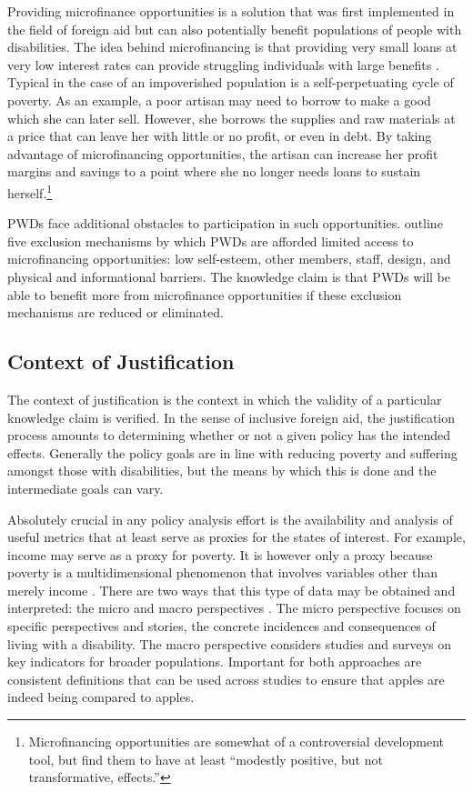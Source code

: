 \documentclass[a4paper]{article}
\begin{document}
Providing microfinance opportunities is a solution that was first implemented
in the field of foreign aid but can also potentially benefit populations of
people with disabilities. The idea behind microfinancing is that providing
very small loans at very low interest rates can provide struggling individuals
with large benefits \citep{wendt2006building}. Typical in the case of an
impoverished population is a self-perpetuating cycle of poverty. As an
example, a poor artisan may need to borrow to make a good which she can later
sell. However, she borrows the supplies and raw materials at a price that can
leave her with little or no profit, or even in debt. By taking advantage of
microfinancing opportunities, the artisan can increase her profit margins and
savings to a point where she no longer needs loans to sustain
herself.\footnote{Microfinancing opportunities are somewhat of a controversial
    development tool, but \cite{banerjee2015six} find them to have at least
``modestly positive, but not transformative, effects.''}

PWDs face additional obstacles to participation in such opportunities.
\cite{mersland2008access} outline five exclusion mechanisms by which PWDs are
afforded limited access to microfinancing opportunities: low self-esteem,
other members, staff, design, and physical and informational barriers. The
knowledge claim is that PWDs will be able to benefit more from microfinance
opportunities if these exclusion mechanisms are reduced or eliminated.

\subsection{Context of Justification}

The context of justification is the context in which the validity of a
particular knowledge claim is verified. In the sense of inclusive foreign aid,
the justification process amounts to determining whether or not a given policy
has the intended effects. Generally the policy goals are in line with reducing
poverty and suffering amongst those with disabilities, but the means by which
this is done and the intermediate goals can vary.

Absolutely crucial in any policy analysis effort is the availability and
analysis of useful metrics that at least serve as proxies for the states of
interest. For example, income may serve as a proxy for poverty. It is however
only a proxy because poverty is a multidimensional phenomenon that involves
variables other than merely income \citep{alkire2011understandings}. There are
two ways that this type of data may be obtained and interpreted: the micro and
macro perspectives \citep{ingstad2011disability}. The micro perspective
focuses on specific perspectives and stories, the concrete incidences and
consequences of living with a disability. The macro perspective considers
studies and surveys on key indicators for broader populations. Important for
both approaches are consistent definitions that can be used across studies to
ensure that apples are indeed being compared to apples.
\end{document}
